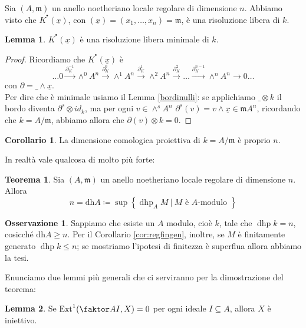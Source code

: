\documentclass[a4paper,11pt,oneside]{book}
\newcommand{\m}{\mathfrak{m}}
\newcommand{\set}[1]{\left\{ #1 \right\}}
\newcommand{\complx}[1]{#1^{^\bullet}}
\renewcommand{\dh}{\mathrm{dh}}
\DeclareMathOperator{\Ext}{Ext}
\DeclareMathOperator{\dhp}{dhp}
\theoremstyle{definition}
\newtheorem{teo}[section]{Teorema}
\newtheorem{lemma}{Lemma}
\newtheorem{cor}{Corollario}
\newtheorem{oss}[section]{Osservazione}
\begin{document}
     Sia $(A,\m)$ un anello noetheriano locale regolare di dimensione $n$. Abbiamo visto che $\complx{K}(\underline{x})$, con 
     $(\underline{x})=(x_1,\dots,x_n)=\m$, è una risoluzione libera di $k$. 
     
     \begin{lemma}
      $\complx{K}(\underline{x})$ è una risoluzione libera minimale di $k$.
     \end{lemma}
     \begin{proof}
     Ricordiamo che  $\complx{K}(\underline{x})$ è
     \[
    \dots 0 \xrightarrow{\partial_K^{-1}} \wedge^0 A^n \xrightarrow{\partial_K^{0}} \wedge^1 A^n \xrightarrow{\partial_K^{1}}\wedge^2 A^n
    \xrightarrow{\partial_K^{2}}\dots\xrightarrow{\partial_K^{n-1}}\wedge^n A^n\rightarrow 0\dots
    \]
      con $\partial=\_\wedge \underline{x}$.\\
      Per dire che è minimale usiamo il Lemma \ref{bordinulli}: se applichiamo $\_\otimes k$
      il bordo diventa $\partial^s\otimes id_k$, ma per ogni $v\in\wedge^s A^n$  $\partial^s(v)= v\wedge \underline{x}\in \m A^n$, ricordando che $k=A/\m$, 
      abbiamo allora che $\partial(v)\otimes k= 0$.
     \end{proof}

     \begin{cor}
      La dimensione comologica proiettiva di $k=A/\m$ è proprio $n$.
     \end{cor}    
     
     In realtà vale qualcosa di molto più forte:
     \begin{teo}
      Sia $(A,\m)$ un anello noetheriano locale regolare di dimensione $n$. Allora 
      \[
        n=\dh A\coloneqq\sup\set{\dhp_A M\ | \ M \text{ è } A\text{-modulo }}
      \]
     \end{teo}

     \begin{oss}
      Sappiamo che esiste un $A$ modulo, cioè $k$, tale che $\dhp k =n$, cosicché $\dh A \geq n$.
      Per il Corollario \ref{cor:regfingen}, inoltre, se $M$ è finitamente generato $\dhp k \leq n$; se mostriamo l'ipotesi di finitezza è
      superflua allora abbiamo la tesi.
     \end{oss}
     
     Enunciamo due lemmi più generali che ci serviranno per la dimostrazione del teorema:
     
     \begin{lemma}
      Se $\Ext^1(\faktor A I, X)=0$ per ogni ideale $I\subseteq A$, allora $X$ è iniettivo.
     \end{lemma}
\end{document}
